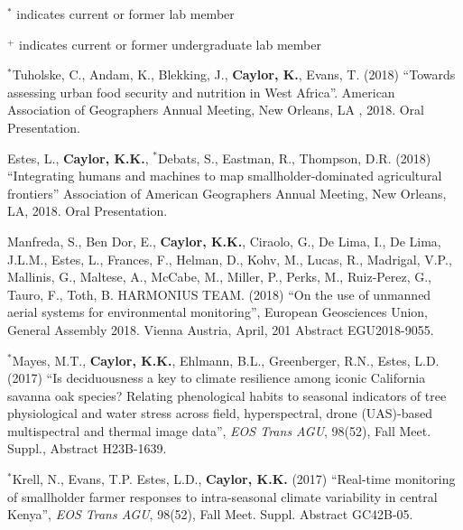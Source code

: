 \documentclass[10pt]{article}
\begin{document}
{ \small $^{*}$ indicates current or former lab member}

{ \small $^{+}$ indicates current or former undergraduate lab member}

\vspace*{.1in}

\begin{etaremune}

\item $^{*}$Tuholske, C., Andam, K., Blekking, J., \textbf{Caylor, K.}, Evans, T. (2018) ``Towards assessing urban food security and nutrition in West Africa''. American Association of Geographers Annual Meeting, New Orleans, LA , 2018. Oral Presentation.

\item Estes, L., \textbf{Caylor, K.K.}, $^{*}$Debats, S., Eastman, R., Thompson, D.R. (2018) ``Integrating humans and machines to map smallholder-dominated agricultural frontiers'' Association of American Geographers Annual Meeting, New Orleans, LA, 2018. Oral Presentation. 

\item Manfreda, S., Ben Dor, E., \textbf{Caylor, K.K.}, Ciraolo, G., De Lima, I., De Lima, J.L.M., Estes, L., Frances, F., Helman, D., Kohv, M., Lucas, R., Madrigal, V.P., Mallinis, G., Maltese, A., McCabe, M., Miller, P., Perks, M., Ruiz-Perez, G., Tauro, F., Toth, B. HARMONIUS TEAM. (2018) ``On the use of unmanned aerial systems for environmental monitoring'', European Geosciences Union, General Assembly 2018. Vienna Austria, April, 201 Abstract EGU2018-9055. 

\item $^{*}$Mayes, M.T., \textbf{Caylor, K.K.}, Ehlmann, B.L., Greenberger, R.N., Estes, L.D. (2017) ``Is deciduousness a key to climate resilience among iconic California savanna oak species? Relating phenological habits to seasonal indicators of tree physiological and water stress across field, hyperspectral, drone (UAS)-based multispectral and thermal image data'', \emph{EOS Trans AGU}, 98(52), Fall Meet. Suppl., Abstract H23B-1639.

\item $^{*}$Krell, N., Evans, T.P. Estes, L.D., \textbf{Caylor, K.K.} (2017) ``Real-time monitoring of smallholder farmer responses to intra-seasonal climate variability in central Kenya'', \emph{EOS Trans AGU}, 98(52), Fall Meet. Suppl. Abstract GC42B-05.


\end{etaremune}
\end{document}
